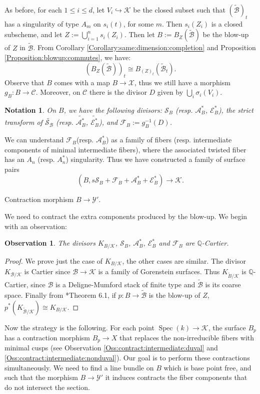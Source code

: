 \documentclass[11pt]{amsart}
\newcommand{\sC}{\mathscr{C}}
\newcommand{\sF}{\mathscr{F}}
\newcommand{\sA}{\mathscr{A}}
\newcommand{\sB}{\mathscr{B}}
\newcommand{\sE}{\mathscr{E}}
\newcommand{\sS}{\mathscr{S}}
\newcommand{\sX}{\mathscr{X}}
\newcommand{\spec}{\operatorname{Spec}}
\newcommand{\Kg}{\mathcal{K}}
\newcommand{\sY}{\mathscr{Y}}
\newtheorem{Oss}[theorem]{Observation}
\newtheorem{Notation}[theorem]{Notation}
\theoremstyle{definition}
\begin{document}
As before, for each $1 \le i \le d$, let $V_i \hookrightarrow \Kg$ be the closed subset such that $(\widetilde{\sB})_t$ has a singularity of type $A_m$ on $s_i(t)$,
for some $m$. Then $s_i(Z_i)$ is a closed subscheme, and let $Z:=\bigcup_{i=1}^ns_i(Z_i)$. Then let $B:=B_{Z}(\widetilde{\sB})$
be the blow-up of $Z$ in $\widetilde{\sB}$.
From Corollary
\ref{Corollary:same:dimension:completion} and Proposition \ref{Proposition:blowup:commutes}, we have:
$$(B_{Z}(\widetilde{\sB}))_{t} \cong B_{(Z)_{t}}(\widetilde{\sB}_t).$$
Observe that $B$ comes with a map $B \to \sX$, thus we still have a morphism $g_B:B \to \sC$. Moreover, on
$\sC$ there is the divisor $D$ given by $\bigcup_i \sigma_i(V_i)$.
\begin{Notation}
On $B$, we have the following divisors: $\sS_{B}$ (resp. $\sA^*_B$, $\sE_B^*$), the strict transform of $\widetilde{\sS_{\sB}}$ (resp.
$\widetilde{\sA^*_B}$, $\widetilde{\sE_B^*}$),
and $\sF_B:=g_B^{-1}(D)$. 
\end{Notation} 
We can understand $\sF_B$(resp. $\sA^*_B$) as a family of  fibers (resp. intermediate components of minimal intermediate fibers),
where the associated twisted fiber
has an $A_n$ (resp. $A_n^*$) singularity.
Thus we have constructed a family of surface pairs
$$(B,s\sS_B+\sF_B+\sA^*_B+\sE_B^*) \to \Kg.$$

\begin{bf}Contraction morphism $B \to \sY'$.\end{bf} We need to contract the extra components produced by the blow-up. We begin with an observation:
\begin{Oss}\label{Oss:before:the:blow:down:Qcartier}
 The divisors $K_{B / \Kg}$, $\sS_B$, $\sA_B^*$, $\sE^*_B$ and $\sF_B$ are $\mathbb{Q}$-Cartier.
\end{Oss}
\begin{proof}We prove just the case of $K_{B / \Kg}$, the other cases are similar.
The divisor $K_{\sB / \Kg}$ is Cartier since $\sB \to \Kg$ is a family of Gorenstein surfaces.
Thus $K_{\widetilde{B}/\Kg}$ is $\mathbb{Q}$-Cartier, since $\sB$ is a Deligne-Mumford stack of finite type and $\widetilde{\sB}$ is its coarse space.
Finally from \cite{AB1}*{Theorem 6.1}, if
$p:B \to \widetilde{\sB}$ is the blow-up of $Z$, $p^*(K_{\widetilde{\sB}/\Kg}) \cong K_{B/\Kg}$.\end{proof}

Now the strategy is the following. For each point $\spec(k) \to \Kg$, the surface $B_p$ has a contraction morphism
$B_p \to X$ that replaces the non-irreducible fibers with minimal cusps
(see Observation \ref{Oss:contract:intermediate:duval} and \ref{Oss:contract:intermediate:nonduval}).
Our goal is to perform these contractions simultaneously. We need to
find a line bundle on
$B$ which is base point free, and such that the morphism
$B \to \sY'$ it induces contracts the fiber components that do not intersect the section. 
\end{document}

